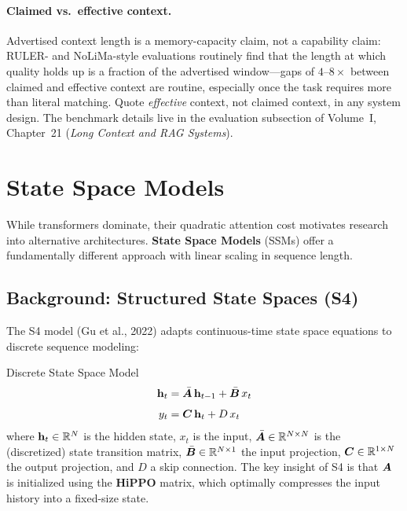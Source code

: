 \paragraph{Claimed vs.\ effective context.}
Advertised context length is a memory-capacity claim, not a capability
claim: RULER- and NoLiMa-style evaluations routinely find that the length
at which quality holds up is a fraction of the advertised window---gaps of
$4$--$8\times$ between claimed and effective context are routine,
especially once the task requires more than literal matching.  Quote \emph{effective} context, not claimed context, in any
system design.  The benchmark details live in the evaluation subsection of
Volume~I, Chapter~21 (\emph{Long Context and RAG Systems}).


\section{State Space Models}
\label{sec:ssm}

While transformers dominate, their quadratic attention cost motivates research
into alternative architectures.  \textbf{State Space Models} (SSMs) offer a
fundamentally different approach with linear scaling in sequence length.

\subsection{Background: Structured State Spaces (S4)}

The S4 model (Gu et al., 2022) adapts continuous-time state space equations
to discrete sequence modeling:

\begin{mathresult}{Discrete State Space Model}
\begin{align}
\mathbf{h}_t &= \bar{\bm{A}}\, \mathbf{h}_{t-1} + \bar{\bm{B}}\, x_t
\label{eq:ssm_state} \\[4pt]
y_t &= \bm{C}\, \mathbf{h}_t + D\, x_t
\label{eq:ssm_output}
\end{align}
where $\mathbf{h}_t \in \mathbb{R}^{N}$ is the hidden state, $x_t$ is the input,
$\bar{\bm{A}} \in \mathbb{R}^{N \times N}$ is the (discretized) state transition matrix,
$\bar{\bm{B}} \in \mathbb{R}^{N \times 1}$ the input projection, $\bm{C} \in \mathbb{R}^{1 \times N}$
the output projection, and $D$ a skip connection.  The key insight of S4 is
that $\bm{A}$ is initialized using the \textbf{HiPPO} matrix, which optimally
compresses the input history into a fixed-size state.
\end{mathresult}

